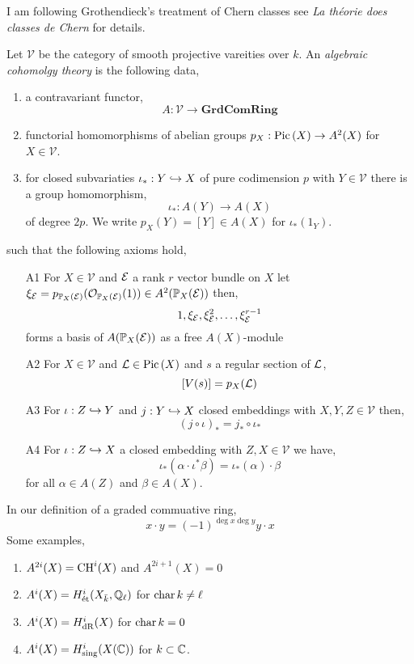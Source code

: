 \documentclass[12pt]{article}
\begin{document}
\newcommand{\cV}{\mathcal{V}}

\begin{rmk}
I am following Grothendieck's treatment of Chern classes see \textit{La th\'{e}orie does classes de Chern} for details.
\end{rmk}

\begin{defn}
Let $\cV$ be the category of smooth projective vareities over $k$. An \textit{algebraic cohomolgy theory} is the following data,
\begin{enumerate}
\item a contravariant functor,
\[ A : \cV \to \mathbf{GrdComRing} \]

\item functorial homomorphisms of abelian groups $p_X : \mathrm{Pic} \left( X \right) \to A^2(X)$ for $X \in \cV$. 

\item for closed subvariaties $\iota_* : Y \hookrightarrow X$ of pure codimension $p$ with $Y \in \cV$ there is a group homomorphism,
\[ \iota_* : A(Y) \to A(X) \]
of degree $2p$. We write $p_X(Y) = [Y] \in A(X)$ for $\iota_*(1_Y)$.
\end{enumerate}
such that the following axioms hold,
\begin{enumerate}
\item[A1] For $X \in \cV$ and $\mathcal{E}$ a rank $r$ vector bundle on $X$ let $\xi_{\mathcal{E}} = p_{\mathbb{P}_X(\mathcal{E})}(\mathcal{O}_{\mathbb{P}_X(\mathcal{E})}(1)) \in A^2(\mathbb{P}_X(\mathcal{E}))$ then, 
\[ 1, \xi_{\mathcal{E}}, \xi_{\mathcal{E}}^2, \dots, \xi_{\mathcal{E}}^{r-1} \]
forms a basis of $A(\mathbb{P}_X(\mathcal{E}))$ as a free $A(X)$-module

\item[A2] For $X \in \cV$ and $\mathcal{L} \in \mathrm{Pic} \left( X \right)$ and $s$ a regular section of $\mathcal{L}$,
\[ [V(s)] = p_X(\mathcal{L}) \]

\item[A3] For $\iota : Z \hookrightarrow Y$ and $j : Y \hookrightarrow X$ closed embeddings with $X,Y,Z \in \cV$ then,
\[ (j \circ \iota)_* = j_* \circ \iota_* \]

\item[A4] For $\iota : Z \hookrightarrow X$ a closed embedding with $Z, X \in \cV$ we have,
\[ \iota_* (\alpha \cdot \iota^* \beta) = \iota_*(\alpha) \cdot \beta \]
for all $\alpha \in A(Z)$ and $\beta \in A(X)$.
\end{enumerate}
\end{defn}

\begin{rmk}
In our definition of a graded commuative ring,
\[ x \cdot y = (-1)^{\deg{x} \deg{y}} y \cdot x \]
Some examples,
\begin{enumerate}
\item $A^{2i}(X) = \mathrm{CH}^{i}(X)$ and $A^{2i+1}(X) = 0$
\item $A^i(X) = H_{\text{\'{e}t}}^i(X_{\bar{k}}, \mathbb{Q}_\ell)$ for $\operatorname{\mathrm{char}}{k} \neq \ell$
\item $A^i(X) = H_{\mathrm{dR}}^i(X)$ for $\operatorname{\mathrm{char}}{k} = 0$
\item $A^i(X) = H_{\text{sing}}^i(X(\mathbb{C}))$ for $k \subset \mathbb{C}$.
\end{enumerate}
\end{rmk}
\end{document}
